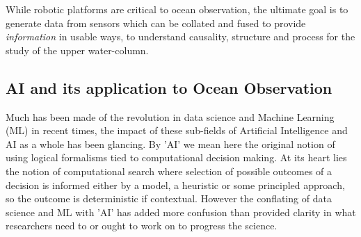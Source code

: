 \begin{figure}
  \centering
  \caption{}
\end{figure}

While robotic platforms are critical to ocean observation, the
ultimate goal is to generate data from sensors which can be collated
and fused to provide \emph{information} in usable ways, to understand
causality, structure and process for the study of the upper
water-column.  

\subsection{AI and its application to Ocean Observation}

Much has been made of the revolution in data science and Machine
Learning (ML) in recent times, the impact of these sub-fields of
Artificial Intelligence and AI as a whole has been glancing. By 'AI'
we mean here the original notion of using logical formalisms tied to
computational decision making. At its heart lies the notion of
computational search where selection of possible outcomes of a
decision is informed either by a model, a heuristic or some principled
approach, so the outcome is deterministic if contextual. However the
conflating of data science and ML with 'AI' has added more confusion
than provided clarity in what researchers need to or ought to work on
to progress the science.

